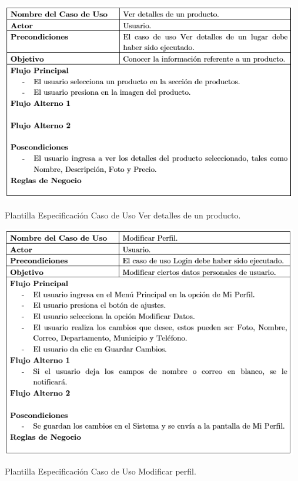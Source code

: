 \documentclass[12pt,letterpaper,openany]{book}
\begin{document}
\begin{table}[H]
\centering
\includegraphics[width=13cm]{./imagenes/PCU/ver_detalles_producto}
\caption{Plantilla Especificación Caso de Uso Ver detalles de un producto.}
\end{table}

\begin{table}[H]
\centering
\includegraphics[width=13cm]{./imagenes/PCU/modificar_perfil}
\caption{Plantilla Especificación Caso de Uso Modificar perfil.}
\end{table}
\end{document}

